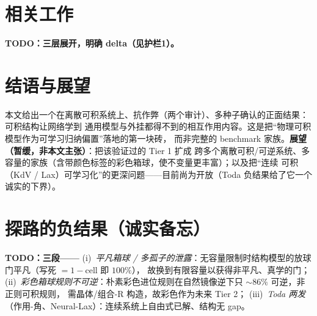 \documentclass[11pt]{article}
\begin{document}
\section{相关工作}\label{sec:related}
\textbf{TODO：三层展开，明确 delta（见护栏1）。}

\section{结语与展望}\label{sec:outlook}
本文给出一个在离散可积系统上、抗作弊（两个审计）、多种子确认的正面结果：可积结构让网络学到
通用模型与外挂都得不到的相互作用内容。这是把“物理可积模型作为可学习归纳偏置”落地的第一块砖，
而非完整的 benchmark 家族。\textbf{展望（暂缓，非本文主张）}：把该验证过的 Tier 1 扩成
跨多个离散可积/可逆系统、多容量的家族（含带颜色标签的彩色箱球，使不变量更丰富）；以及把“连续
可积（KdV / Lax）可学习化”的更深问题——目前尚为开放（Toda 负结果给了它一个诚实的下界）。

\appendix
\section{探路的负结果（诚实备忘）}\label{app:negatives}
\textbf{TODO：三段——}
(i)~\emph{平凡箱球 / 多孤子的泄露}：无容量限制时结构模型的放球门平凡（写死 $=1-$cell 即 $100\%$），
故换到有限容量以获得非平凡、真学的门；
(ii)~\emph{彩色箱球规则不可逆}：朴素彩色进位规则在自然镜像逆下只 $\sim86\%$ 可逆，非正则可积规则，
需晶体/组合-R 构造，故彩色作为未来 Tier 2；
(iii)~\emph{Toda 两发}（作用-角、Neural-Lax）：连续系统上自由式已解、结构无 gap。



\end{document}
